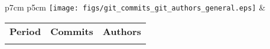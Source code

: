 \begin{tabular}{p{7cm} p{5cm}}
	\vspace{0pt} 
	\texttt{[image: figs/git\_commits\_git\_authors\_general.eps]}
	& 
	\vspace{0pt}
	\begin{tabular}{l|r|r|}
		\bfseries Period & \bfseries Commits & \bfseries Authors
		\csvreader[head to column names]{data/git_commits_git_authors_general.csv}{}
		{\\ & \commits & \authors}
	\end{tabular}
\end{tabular}
